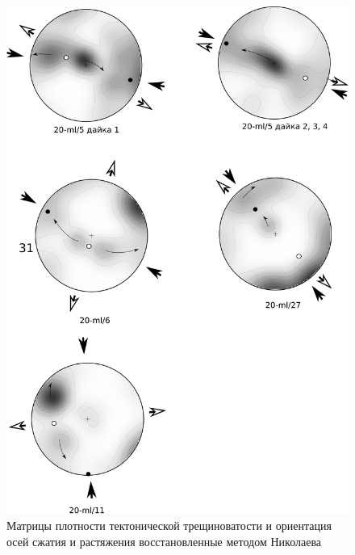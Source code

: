\begin{figure}[H]
\begin{changemargin}{0cm}{0cm}
  \begin{center}
    \begin{minipage}[h]{0.6\linewidth}
        \includegraphics[width=1\textwidth]{authors/kondratev-fig2.png}
        \caption{Матрицы плотности тектонической трещиноватости и ориентация осей сжатия и растяжения восстановленные методом Николаева}
        \label{fig:kondratev-fig2}
    \end{minipage}
\hfill
    \begin{minipage}[h]{0.33\linewidth}
      \begin{center}

\end{center}
\end{minipage}
\end{center}
\end{changemargin}
\end{figure}
